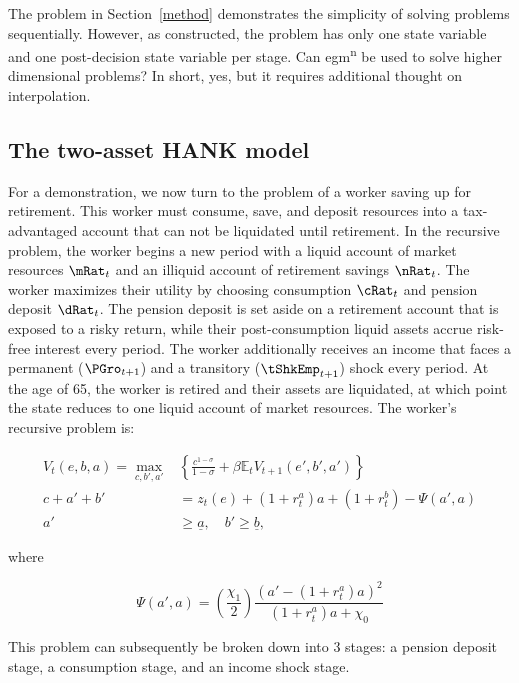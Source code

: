 \documentclass{article}
\begin{document}
The problem in Section~\ref{method} demonstrates the simplicity of solving problems sequentially. However, as constructed, the problem has only one state variable and one post-decision state variable per stage. Can \acrshort{egm}\textsuperscript{n} be used to solve higher dimensional problems? In short, yes, but it requires additional thought on interpolation.

\subsection{The two-asset HANK model}

For a demonstration, we now turn to the problem of a worker saving up for retirement. This worker must consume, save, and deposit resources into a tax-advantaged account that can not be liquidated until retirement. In the recursive problem, the worker begins a new period with a liquid account of market resources $\mRat_{t}$ and an illiquid account of retirement savings $\nRat_{t}$. The worker maximizes their utility by choosing consumption $\cRat_{t}$ and pension deposit $\dRat_{t}$. The pension deposit is set aside on a retirement account that is exposed to a risky return, while their post-consumption liquid assets accrue risk-free interest every period. The worker additionally receives an income that faces a permanent ($\PGro_{t+1}$) and a transitory ($\tShkEmp_{t+1}$) shock every period. At the age of 65, the worker is retired and their assets are liquidated, at which point the state reduces to one liquid account of market resources. The worker's recursive problem is:

\begin{align} \tag{1}
    V_t(e, b, a) = \max_{c, b', a'} & \left\{\frac{c^{1-\sigma}}{1-\sigma} + \beta \mathbb{E}_t V_{t+1}(e', b', a') \right\}
    \\
    c + a' + b'                     & = z_t(e) + (1 + r_t^a)a + (1 + r_t^b) - \Psi(a', a)
    \\
    a'                              & \geq \underline{a}, \quad b' \geq \underline{b},
\end{align}

where

\begin{equation}
\Psi(a', a) = \left(\frac{\chi_1}{2}\right)  \frac{(a' - (1+r_t^a)a)^2}{(1+r_t^a)a + \chi_0}
\end{equation}

This problem can subsequently be broken down into 3 stages: a pension deposit stage, a consumption stage, and an income shock stage.
\end{document}
